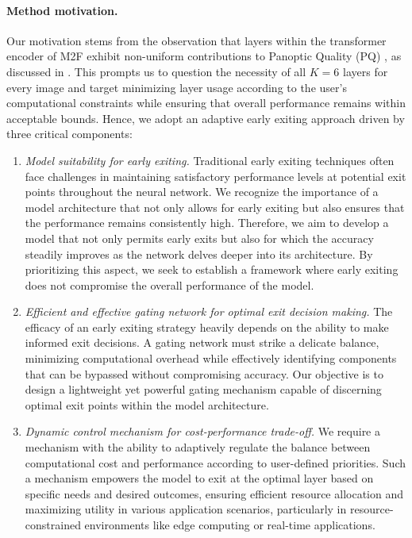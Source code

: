 \paragraph{Method motivation.} Our motivation stems from the observation that layers within the transformer encoder of M2F exhibit non-uniform contributions to Panoptic Quality (PQ) \cite{kirillov2019panoptic}, as discussed in . This prompts us to question the necessity of all $K=6$ layers for every image and target minimizing layer usage according to the user's computational constraints while ensuring that overall performance remains within acceptable bounds. Hence, we adopt an adaptive early exiting approach driven by three critical components:
\begin{enumerate}
    \item \emph{Model suitability for early exiting.} Traditional early exiting techniques \cite{tang2023you, xu2023lgvit, liu2021mevt, wang2022single, jiang2023multi, yang2023exploiting, valade2024eero, tang2023need, zhang2023adaptive} often face challenges in maintaining satisfactory performance levels at potential exit points throughout the neural network. We recognize the importance of a model architecture that not only allows for early exiting but also ensures that the performance remains consistently high. Therefore, we aim to develop a model that not only permits early exits but also for which the accuracy steadily improves as the network delves deeper into its architecture. By prioritizing this aspect, we seek to establish a framework where early exiting does not compromise the overall performance of the model.
    \item \emph{Efficient and effective gating network for optimal exit decision making.} The efficacy of an early exiting strategy heavily depends on the ability to make informed exit decisions. A gating network must strike a delicate balance, minimizing computational overhead while effectively identifying components that can be bypassed without compromising accuracy. Our objective is to design a lightweight yet powerful gating mechanism capable of discerning optimal exit points within the model architecture.
    \item \emph{Dynamic control mechanism for cost-performance trade-off.} We require a mechanism with the ability to adaptively regulate the balance between computational cost and performance according to user-defined priorities. Such a mechanism empowers the model to exit at the optimal layer based on specific needs and desired outcomes, ensuring efficient resource allocation and maximizing utility in various application scenarios, particularly in resource-constrained environments like edge computing or real-time applications.
\end{enumerate}

